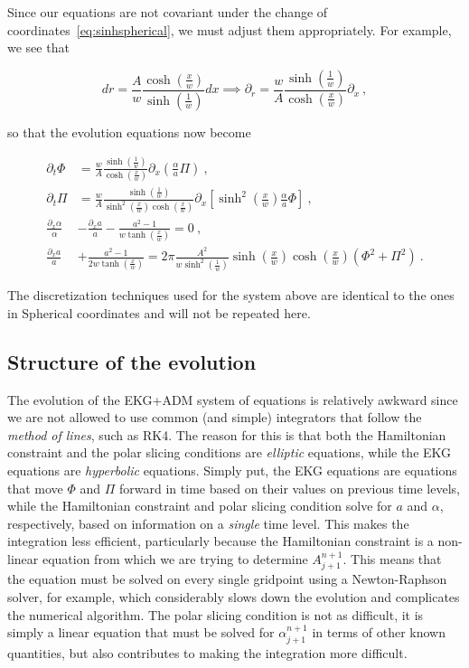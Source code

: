 \documentclass[a4paper,11pt]{article}
\renewcommand{\a}{\alpha}
\newcommand{\pd}{\partial}
\newcommand{\lrpar}[1]{\left( #1 \right)}
\newcommand{\lrsquare}[1]{\left[ #1 \right]}
\newcommand{\n}{\noindent}
\newcommand{\eq}[1]{
  \begin{equation}
    #1
  \end{equation}
}
\newcommand{\al}[1]{
  \begin{align}
    #1
  \end{align}
}
\begin{document}
Since our equations are not covariant under the change of coordinates~\eqref{eq:sinhspherical}, we must adjust them appropriately. For example, we see that

\eq{ dr = \frac{A}{w}\frac{\cosh\!\lrpar{\frac{x}{w}}}{\sinh\!\lrpar{\frac{1}{w}}}dx \implies \pd_{r} = \frac{w}{A}\frac{\sinh\!\lrpar{\frac{1}{w}}}{\cosh\!\lrpar{\frac{x}{w}}} \pd_{x}\ ,}

\n so that the evolution equations now become

\al{
  \pd_{t}\Phi &= \frac{w}{A}\frac{\sinh\!\lrpar{\frac{1}{w}}}{\cosh\!\lrpar{\frac{x}{w}}} \pd_{x}\lrpar{\frac{\a}{a}\Pi}\ ,\\
  \pd_{t}\Pi  &= \frac{w}{A}\frac{\sinh\!\lrpar{\frac{1}{w}}}{\sinh^{2}\!\lrpar{\frac{x}{w}}\cosh\!\lrpar{\frac{x}{w}}} \pd_{x}\lrsquare{\sinh^{2}\!\lrpar{\frac{x}{w}}\frac{\a}{a}\Phi}\ ,\\
  \frac{\pd_{x}\a}{\a} &- \frac{\pd_{x} a}{a} - \frac{a^{2}-1}{w\tanh\!\lrpar{\frac{x}{w}}} = 0\ ,\\
  \frac{\pd_{x} a}{a} &+ \frac{a^{2}-1}{2w\tanh\!\lrpar{\frac{x}{w}}} = 2\pi\frac{A^{2}}{w\sinh^{2}\!\lrpar{\frac{1}{w}}}\sinh\!\lrpar{\frac{x}{w}}\cosh\!\lrpar{\frac{x}{w}}\lrpar{\Phi^{2} + \Pi^{2}}\ .
}

\n The discretization techniques used for the system above are identical to the ones in Spherical coordinates and will not be repeated here.

\subsection{Structure of the evolution}

The evolution of the EKG+ADM system of equations is relatively awkward since we are not allowed to use common (and simple) integrators that follow the \emph{method of lines}, such as RK4. The reason for this is that both the Hamiltonian constraint and the polar slicing conditions are \emph{elliptic} equations, while the EKG equations are \emph{hyperbolic} equations. Simply put, the EKG equations are equations that move $\Phi$ and $\Pi$ forward in time based on their values on previous time levels, while the Hamiltonian constraint and polar slicing condition solve for $a$ and $\a$, respectively, based on information on a \emph{single} time level. This makes the integration less efficient, particularly because the Hamiltonian constraint is a non-linear equation from which we are trying to determine $A^{n+1}_{j+1}$. This means that the equation must be solved on every single gridpoint using a Newton-Raphson solver, for example, which considerably slows down the evolution and complicates the numerical algorithm. The polar slicing condition is not as difficult, it is simply a linear equation that must be solved for $\a^{n+1}_{j+1}$ in terms of other known quantities, but also contributes to making the integration more difficult.
\end{document}
